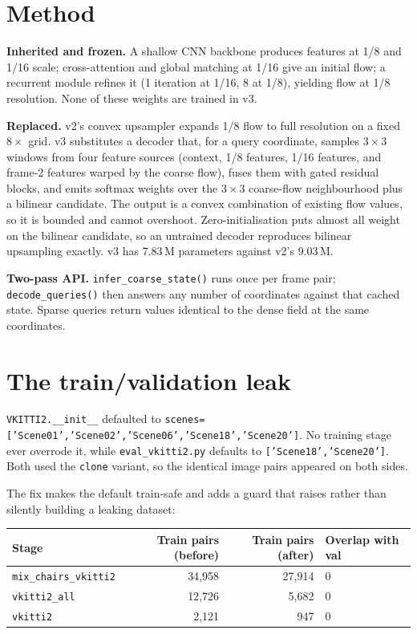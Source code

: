 \documentclass[11pt,a4paper]{article}
\begin{document}
\section{Method}

\textbf{Inherited and frozen.} A shallow CNN backbone produces features at 1/8
and 1/16 scale; cross-attention and global matching at 1/16 give an initial
flow; a recurrent module refines it (1 iteration at 1/16, 8 at 1/8), yielding
flow at 1/8 resolution. None of these weights are trained in v3.

\textbf{Replaced.} v2's convex upsampler expands 1/8 flow to full resolution on
a fixed $8\times$ grid. v3 substitutes a decoder that, for a query coordinate,
samples $3{\times}3$ windows from four feature sources (context, 1/8 features,
1/16 features, and frame-2 features warped by the coarse flow), fuses them with
gated residual blocks, and emits softmax weights over the $3{\times}3$
coarse-flow neighbourhood plus a bilinear candidate. The output is a convex
combination of existing flow values, so it is bounded and cannot overshoot.
Zero-initialisation puts almost all weight on the bilinear candidate, so an
untrained decoder reproduces bilinear upsampling exactly. v3 has 7.83\,M
parameters against v2's 9.03\,M.

\textbf{Two-pass API.} \texttt{infer\_coarse\_state()} runs once per frame pair;
\texttt{decode\_queries()} then answers any number of coordinates against that
cached state. Sparse queries return values identical to the dense field at the
same coordinates.

\section{The train/validation leak}
\label{sec:fix}

\texttt{VKITTI2.\_\_init\_\_} defaulted to
\texttt{scenes=['Scene01','Scene02','Scene06','Scene18','Scene20']}. No
training stage ever overrode it, while \texttt{eval\_vkitti2.py} defaults to
\texttt{['Scene18','Scene20']}. Both used the \texttt{clone} variant, so the
identical image pairs appeared on both sides.

The fix makes the default train-safe and adds a guard that raises rather than
silently building a leaking dataset:

\begin{center}
\small
\begin{tabular}{@{}lrrl@{}}
\toprule
Stage & Train pairs (before) & Train pairs (after) & Overlap with val \\
\midrule
\texttt{mix\_chairs\_vkitti2} & 34{,}958 & 27{,}914 & 0 \\
\texttt{vkitti2\_all}         & 12{,}726 &  5{,}682 & 0 \\
\texttt{vkitti2}              &  2{,}121 &    947   & 0 \\
\bottomrule
\end{tabular}
\end{center}
\end{document}
